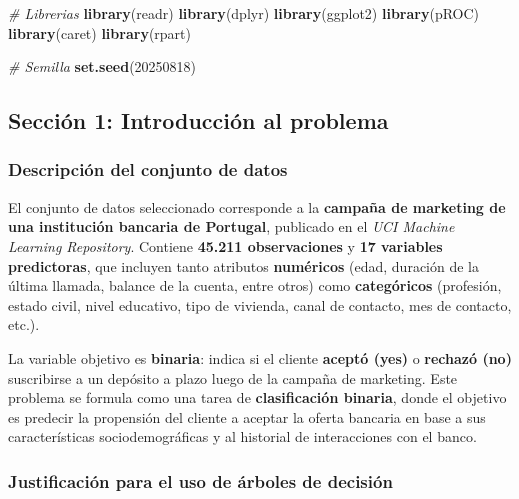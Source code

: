 \documentclass[
]{article}
\author{}
\date{\vspace{-2.5em}}
\newenvironment{Shaded}{\begin{snugshade}}{\end{snugshade}}
\newcommand{\CommentTok}[1]{\textcolor[rgb]{0.56,0.35,0.01}{\textit{#1}}}
\newcommand{\DecValTok}[1]{\textcolor[rgb]{0.00,0.00,0.81}{#1}}
\newcommand{\FunctionTok}[1]{\textcolor[rgb]{0.13,0.29,0.53}{\textbf{#1}}}
\newcommand{\NormalTok}[1]{#1}
\begin{document}
\begin{Shaded}
\begin{Highlighting}[]
\CommentTok{\# Librerias}
\FunctionTok{library}\NormalTok{(readr)}
\FunctionTok{library}\NormalTok{(dplyr)}
\FunctionTok{library}\NormalTok{(ggplot2)}
\FunctionTok{library}\NormalTok{(pROC)}
\FunctionTok{library}\NormalTok{(caret)}
\FunctionTok{library}\NormalTok{(rpart)}

\CommentTok{\# Semilla}
\FunctionTok{set.seed}\NormalTok{(}\DecValTok{20250818}\NormalTok{)}
\end{Highlighting}
\end{Shaded}

\subsection{Sección 1: Introducción al
problema}\label{secciuxf3n-1-introducciuxf3n-al-problema}

\subsubsection{Descripción del conjunto de
datos}\label{descripciuxf3n-del-conjunto-de-datos}

El conjunto de datos seleccionado corresponde a la \textbf{campaña de
marketing de una institución bancaria de Portugal}, publicado en el
\emph{UCI Machine Learning Repository}. Contiene \textbf{45.211
observaciones} y \textbf{17 variables predictoras}, que incluyen tanto
atributos \textbf{numéricos} (edad, duración de la última llamada,
balance de la cuenta, entre otros) como \textbf{categóricos} (profesión,
estado civil, nivel educativo, tipo de vivienda, canal de contacto, mes
de contacto, etc.).

La variable objetivo es \textbf{binaria}: indica si el cliente
\textbf{aceptó (yes)} o \textbf{rechazó (no)} suscribirse a un depósito
a plazo luego de la campaña de marketing. Este problema se formula como
una tarea de \textbf{clasificación binaria}, donde el objetivo es
predecir la propensión del cliente a aceptar la oferta bancaria en base
a sus características sociodemográficas y al historial de interacciones
con el banco.

\subsubsection{Justificación para el uso de árboles de
decisión}\label{justificaciuxf3n-para-el-uso-de-uxe1rboles-de-decisiuxf3n}
\end{document}
